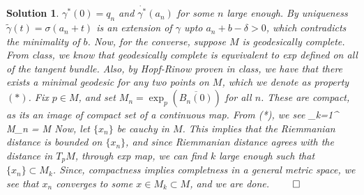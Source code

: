 \documentclass[11pt]{article}
\theoremstyle{plain}
\def\eQb#1\eQe{\begin{eqnarray*}#1\end{eqnarray*}}
\theoremstyle{quest}
\newtheorem*{solution}{Solution}
\begin{document}
\begin{solution}
$\gamma^*(0) = q_n$ and $\dot{\gamma^*}(a_n)$ for some $n$ large enough. By
uniqueness $\tilde{\gamma}(t) = \sigma(a_n + t)$ is an extension of
$\gamma$ upto $a_n + b - \delta > 0$, which contradicts the minimality of $b$. Now,
for the converse, suppose $M$ is geodesically complete. From class, we know that
geodesically complete is equvivalent to exp defined on all of the tangent bundle.
Also, by Hopf-Rinow proven in class, we have that there exists a minimal geodesic
for any two points on $M$, which we denote as property $(*)$.
Fix $p \in M$, and set $M_n = \exp_p(\overline{B_n(0)})$
for all $n$. These are compact, as its an image of compact set of a continuous map. 
From (*), we see 
\eQb
\bigcup_{k=1}^{\infty} M_n = M
\eQe 
Now, let $\{x_n\}$ be cauchy in $M$. This implies that the Riemmanian distance is bounded
on $\{x_n\}$, and since Riemmanian distance agrees with the distance in $T_pM$, through
exp map, we can find $k$ large enough such that $\{x_n\} \subset M_k$. Since, compactness
implies completness in a general metric space, we see that $x_n$ converges to
some $x \in M_k \subset M$, and we are done. \hfill $\qed$ 
\end{solution}

\newpage
\end{document}
